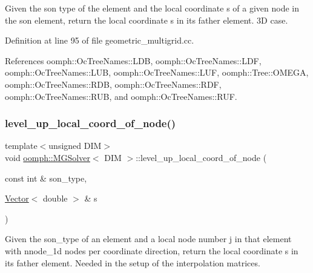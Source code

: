 Given the son type of the element and the local coordinate s of a given node in the son element, return the local coordinate s in its father element. 3D case. 



Definition at line 95 of file geometric\+\_\+multigrid.\+cc.



References oomph\+::\+Oc\+Tree\+Names\+::\+L\+DB, oomph\+::\+Oc\+Tree\+Names\+::\+L\+DF, oomph\+::\+Oc\+Tree\+Names\+::\+L\+UB, oomph\+::\+Oc\+Tree\+Names\+::\+L\+UF, oomph\+::\+Tree\+::\+O\+M\+E\+GA, oomph\+::\+Oc\+Tree\+Names\+::\+R\+DB, oomph\+::\+Oc\+Tree\+Names\+::\+R\+DF, oomph\+::\+Oc\+Tree\+Names\+::\+R\+UB, and oomph\+::\+Oc\+Tree\+Names\+::\+R\+UF.

\mbox{\label{classoomph_1_1MGSolver_a28c5bc08c12849ac16bc0d78bdb9b58a}} 
\subsubsection{\texorpdfstring{level\+\_\+up\+\_\+local\+\_\+coord\+\_\+of\+\_\+node()}{level\_up\_local\_coord\_of\_node()}\hspace{0.1cm}{\footnotesize\ttfamily [3/3]}}
{\footnotesize\ttfamily template$<$unsigned D\+IM$>$ \\
void \hyperlink{classoomph_1_1MGSolver}{oomph\+::\+M\+G\+Solver}$<$ D\+IM $>$\+::level\+\_\+up\+\_\+local\+\_\+coord\+\_\+of\+\_\+node (\begin{DoxyParamCaption}\item[{const int \&}]{son\+\_\+type,  }\item[{\hyperlink{classoomph_1_1Vector}{Vector}$<$ double $>$ \&}]{s }\end{DoxyParamCaption})}



Given the son\+\_\+type of an element and a local node number j in that element with nnode\+\_\+1d nodes per coordinate direction, return the local coordinate s in its father element. Needed in the setup of the interpolation matrices. 

\mbox{\label{classoomph_1_1MGSolver_a70f1090e0673b8f9c4b87080adff0e2f}} 
